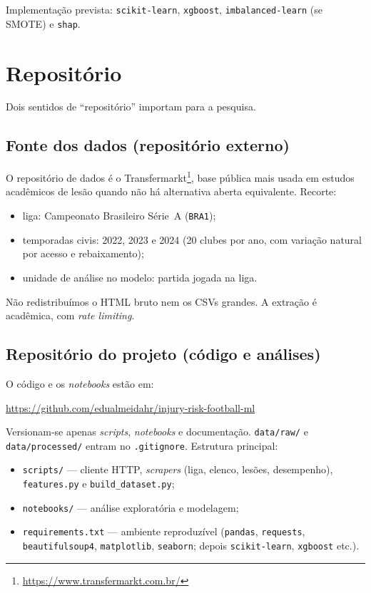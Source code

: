 \documentclass[11pt,a4paper]{article}
\begin{document}
Implementação prevista: \texttt{scikit-learn}, \texttt{xgboost}, \texttt{imbalanced-learn} (se SMOTE) e \texttt{shap}.

\section{Repositório}

Dois sentidos de ``repositório'' importam para a pesquisa.

\subsection{Fonte dos dados (repositório externo)}

O repositório de dados é o Transfermarkt\footnote{\url{https://www.transfermarkt.com.br/}}, base pública mais usada em estudos acadêmicos de lesão quando não há alternativa aberta equivalente. Recorte:

\begin{itemize}
  \item liga: Campeonato Brasileiro Série~A (\texttt{BRA1});
  \item temporadas civis: 2022, 2023 e 2024 (20 clubes por ano, com variação natural por acesso e rebaixamento);
  \item unidade de análise no modelo: partida jogada na liga.
\end{itemize}

Não redistribuímos o HTML bruto nem os CSVs grandes. A extração é acadêmica, com \textit{rate limiting}.

\subsection{Repositório do projeto (código e análises)}

O código e os \textit{notebooks} estão em:

\begin{center}
\url{https://github.com/edualmeidahr/injury-risk-football-ml}
\end{center}

Versionam-se apenas \textit{scripts}, \textit{notebooks} e documentação. \texttt{data/raw/} e \texttt{data/processed/} entram no \texttt{.gitignore}. Estrutura principal:

\begin{itemize}
  \item \texttt{scripts/} --- cliente HTTP, \textit{scrapers} (liga, elenco, lesões, desempenho), \texttt{features.py} e \texttt{build\_dataset.py};
  \item \texttt{notebooks/} --- análise exploratória e modelagem;
  \item \texttt{requirements.txt} --- ambiente reproduzível (\texttt{pandas}, \texttt{requests}, \texttt{beautifulsoup4}, \texttt{matplotlib}, \texttt{seaborn}; depois \texttt{scikit-learn}, \texttt{xgboost} etc.).
\end{itemize}
\end{document}
